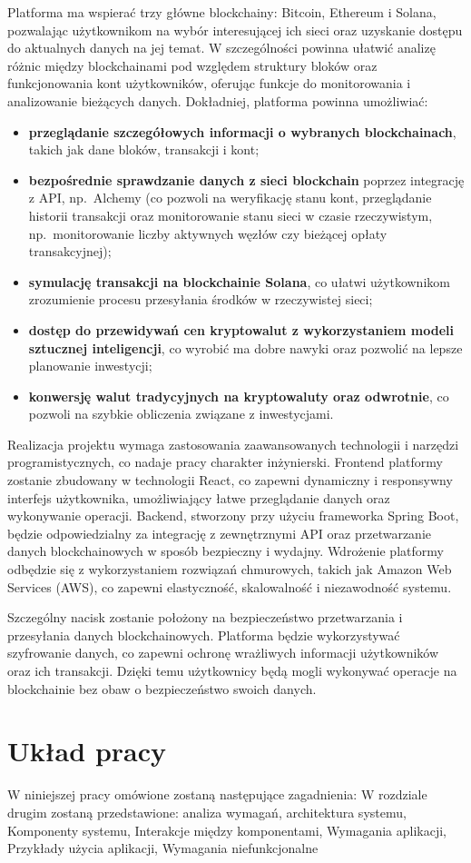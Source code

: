 Platforma ma wspierać trzy główne blockchainy: Bitcoin, Ethereum i Solana, pozwalając użytkownikom na wybór interesującej ich sieci oraz uzyskanie dostępu do aktualnych danych na jej temat. W szczególności powinna ułatwić analizę różnic między blockchainami pod względem struktury bloków oraz funkcjonowania kont użytkowników, oferując funkcje do monitorowania i analizowanie bieżących danych. Dokładniej, platforma powinna umożliwiać:
\begin{itemize}
\item \textbf{przeglądanie szczegółowych informacji o wybranych blockchainach}, takich jak dane bloków, transakcji i kont; 
\item \textbf{bezpośrednie sprawdzanie danych z sieci blockchain} poprzez integrację z API, np.\ Alchemy (co pozwoli na weryfikację stanu kont, przeglądanie historii transakcji oraz monitorowanie stanu sieci  w czasie rzeczywistym, np.\ monitorowanie liczby aktywnych węzłów czy bieżącej opłaty transakcyjnej);
\item \textbf{symulację transakcji na blockchainie Solana}, co ułatwi użytkownikom zrozumienie procesu przesyłania środków w rzeczywistej sieci;
\item \textbf{dostęp do przewidywań cen kryptowalut z wykorzystaniem modeli sztucznej inteligencji}, co wyrobić ma dobre nawyki oraz pozwolić na lepsze planowanie inwestycji;
\item \textbf{konwersję walut tradycyjnych na kryptowaluty oraz odwrotnie}, co pozwoli na szybkie obliczenia związane z inwestycjami. 
\end{itemize}

Realizacja projektu wymaga zastosowania zaawansowanych technologii i narzędzi programistycznych, co nadaje pracy charakter inżynierski. Frontend platformy zostanie zbudowany w technologii React, co zapewni dynamiczny i responsywny interfejs użytkownika, umożliwiający łatwe przeglądanie danych oraz wykonywanie operacji. Backend, stworzony przy użyciu frameworka Spring Boot, będzie odpowiedzialny za integrację z zewnętrznymi API oraz przetwarzanie danych blockchainowych w sposób bezpieczny i wydajny. Wdrożenie platformy odbędzie się z wykorzystaniem rozwiązań chmurowych, takich jak Amazon Web Services (AWS), co zapewni elastyczność, skalowalność i niezawodność systemu.

Szczególny nacisk zostanie położony na bezpieczeństwo przetwarzania i przesyłania danych blockchainowych. Platforma będzie wykorzystywać szyfrowanie danych, co zapewni ochronę wrażliwych informacji użytkowników oraz ich transakcji. Dzięki temu użytkownicy będą mogli wykonywać operacje na blockchainie bez obaw o bezpieczeństwo swoich danych.

\section{Układ pracy} W niniejszej pracy omówione zostaną następujące zagadnienia:
W rozdziale drugim zostaną przedstawione: analiza wymagań, architektura systemu, Komponenty systemu, Interakcje między komponentami, Wymagania aplikacji, Przykłady użycia aplikacji, Wymagania niefunkcjonalne